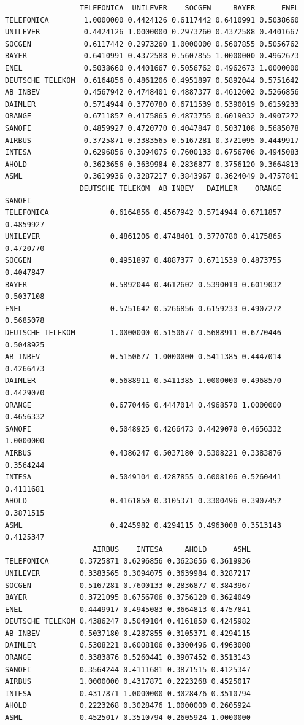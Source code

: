 \documentclass[
  12pt,
  brazil,
  a4paper,
  openany]{book}
\begin{document}
\begin{verbatim}
                 TELEFONICA  UNILEVER    SOCGEN     BAYER      ENEL
TELEFONICA        1.0000000 0.4424126 0.6117442 0.6410991 0.5038660
UNILEVER          0.4424126 1.0000000 0.2973260 0.4372588 0.4401667
SOCGEN            0.6117442 0.2973260 1.0000000 0.5607855 0.5056762
BAYER             0.6410991 0.4372588 0.5607855 1.0000000 0.4962673
ENEL              0.5038660 0.4401667 0.5056762 0.4962673 1.0000000
DEUTSCHE TELEKOM  0.6164856 0.4861206 0.4951897 0.5892044 0.5751642
AB INBEV          0.4567942 0.4748401 0.4887377 0.4612602 0.5266856
DAIMLER           0.5714944 0.3770780 0.6711539 0.5390019 0.6159233
ORANGE            0.6711857 0.4175865 0.4873755 0.6019032 0.4907272
SANOFI            0.4859927 0.4720770 0.4047847 0.5037108 0.5685078
AIRBUS            0.3725871 0.3383565 0.5167281 0.3721095 0.4449917
INTESA            0.6296856 0.3094075 0.7600133 0.6756706 0.4945083
AHOLD             0.3623656 0.3639984 0.2836877 0.3756120 0.3664813
ASML              0.3619936 0.3287217 0.3843967 0.3624049 0.4757841
                 DEUTSCHE TELEKOM  AB INBEV   DAIMLER    ORANGE    SANOFI
TELEFONICA              0.6164856 0.4567942 0.5714944 0.6711857 0.4859927
UNILEVER                0.4861206 0.4748401 0.3770780 0.4175865 0.4720770
SOCGEN                  0.4951897 0.4887377 0.6711539 0.4873755 0.4047847
BAYER                   0.5892044 0.4612602 0.5390019 0.6019032 0.5037108
ENEL                    0.5751642 0.5266856 0.6159233 0.4907272 0.5685078
DEUTSCHE TELEKOM        1.0000000 0.5150677 0.5688911 0.6770446 0.5048925
AB INBEV                0.5150677 1.0000000 0.5411385 0.4447014 0.4266473
DAIMLER                 0.5688911 0.5411385 1.0000000 0.4968570 0.4429070
ORANGE                  0.6770446 0.4447014 0.4968570 1.0000000 0.4656332
SANOFI                  0.5048925 0.4266473 0.4429070 0.4656332 1.0000000
AIRBUS                  0.4386247 0.5037180 0.5308221 0.3383876 0.3564244
INTESA                  0.5049104 0.4287855 0.6008106 0.5260441 0.4111681
AHOLD                   0.4161850 0.3105371 0.3300496 0.3907452 0.3871515
ASML                    0.4245982 0.4294115 0.4963008 0.3513143 0.4125347
                    AIRBUS    INTESA     AHOLD      ASML
TELEFONICA       0.3725871 0.6296856 0.3623656 0.3619936
UNILEVER         0.3383565 0.3094075 0.3639984 0.3287217
SOCGEN           0.5167281 0.7600133 0.2836877 0.3843967
BAYER            0.3721095 0.6756706 0.3756120 0.3624049
ENEL             0.4449917 0.4945083 0.3664813 0.4757841
DEUTSCHE TELEKOM 0.4386247 0.5049104 0.4161850 0.4245982
AB INBEV         0.5037180 0.4287855 0.3105371 0.4294115
DAIMLER          0.5308221 0.6008106 0.3300496 0.4963008
ORANGE           0.3383876 0.5260441 0.3907452 0.3513143
SANOFI           0.3564244 0.4111681 0.3871515 0.4125347
AIRBUS           1.0000000 0.4317871 0.2223268 0.4525017
INTESA           0.4317871 1.0000000 0.3028476 0.3510794
AHOLD            0.2223268 0.3028476 1.0000000 0.2605924
ASML             0.4525017 0.3510794 0.2605924 1.0000000
\end{verbatim}
\end{document}
